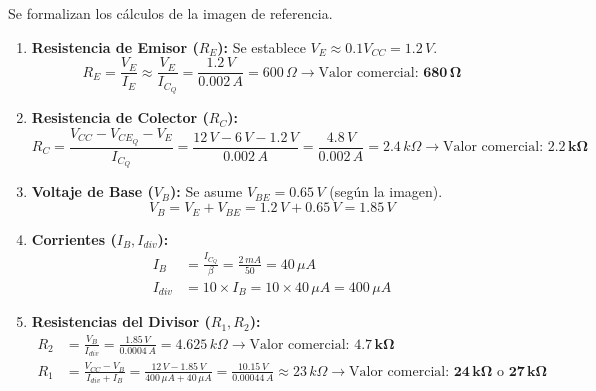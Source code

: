 \documentclass[11pt]{scrartcl}
\begin{document}
Se formalizan los cálculos de la imagen de referencia.
\begin{enumerate}
    \item \textbf{Resistencia de Emisor ($R_E$):} Se establece $V_E \approx 0.1 V_{CC} = 1.2 \, V$.
    \begin{equation*}
        R_E = \frac{V_E}{I_E} \approx \frac{V_E}{I_{C_Q}} = \frac{1.2 \, V}{0.002 \, A} = 600 \, \Omega \rightarrow \text{Valor comercial: } \mathbf{680 \, \Omega}
    \end{equation*}

    \item \textbf{Resistencia de Colector ($R_C$):}
    \begin{equation*}
        R_C = \frac{V_{CC} - V_{CE_Q} - V_E}{I_{C_Q}} = \frac{12 \, V - 6 \, V - 1.2 \, V}{0.002 \, A} = \frac{4.8 \, V}{0.002 \, A} = 2.4 \, k\Omega \rightarrow \text{Valor comercial: } \mathbf{2.2 \, k\Omega}
    \end{equation*}
    
    \item \textbf{Voltaje de Base ($V_B$):} Se asume $V_{BE} = 0.65 \, V$ (según la imagen).
    \begin{equation*}
        V_B = V_E + V_{BE} = 1.2 \, V + 0.65 \, V = 1.85 \, V
    \end{equation*}
    
    \item \textbf{Corrientes ($I_B, I_{div}$):}
    \begin{align*}
        I_B &= \frac{I_{C_Q}}{\beta} = \frac{2 \, mA}{50} = 40 \, \mu A \\
        I_{div} &= 10 \times I_B = 10 \times 40 \, \mu A = 400 \, \mu A
    \end{align*}
    
    \item \textbf{Resistencias del Divisor ($R_1, R_2$):}
    \begin{align*}
        R_2 &= \frac{V_B}{I_{div}} = \frac{1.85 \, V}{0.0004 \, A} = 4.625 \, k\Omega \rightarrow \text{Valor comercial: } \mathbf{4.7 \, k\Omega} \\
        R_1 &= \frac{V_{CC} - V_B}{I_{div} + I_B} = \frac{12 \, V - 1.85 \, V}{400 \, \mu A + 40 \, \mu A} = \frac{10.15 \, V}{0.00044 \, A} \approx 23 \, k\Omega \rightarrow \text{Valor comercial: } \mathbf{24 \, k\Omega} \text{ o } \mathbf{27 \, k\Omega}
    \end{align*}
\end{enumerate}
\end{document}

